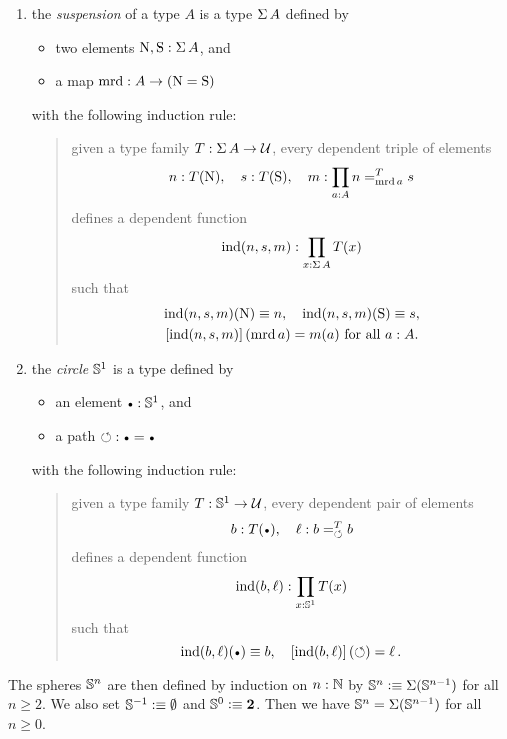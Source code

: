 \documentclass[english,a4paper]{lmcs}
\begin{document}
\begin{enumerate}
\item the \emph{suspension} of a type $A$ is a type $\operatorname{\Sigma} A$ defined
  by
  \begin{itemize}
  \item two elements $\mathrm{N},\mathrm{S}: \operatorname{\Sigma} A$, and
  \item a  map $\operatorname{\mathrm{mrd}} : A \to (\mathrm{N}=\mathrm{S})$
  \end{itemize}
  with the following induction rule:
  \begin{quote}
    given a type family $T: \operatorname{\Sigma} A \to \mathcal{U}$, every dependent
    triple of elements
    \begin{displaymath}
      n: T(\mathrm{N}), \quad s: T(\mathrm{S}),\quad
      m: \prod_{a: A}n =^{T}_{\operatorname{\mathrm{mrd}} a} s
    \end{displaymath}
    defines a dependent function
    \begin{displaymath}
      \operatorname{\mathrm{ind}}(n,s,m):\prod_{x: \operatorname{\Sigma} A} T(x)
    \end{displaymath}
    such that
    \begin{gather*}
      \operatorname{\mathrm{ind}}(n,s,m)(\mathrm{N}) \equiv n,\quad
      \operatorname{\mathrm{ind}}(n,s,m)(\mathrm{S}) \equiv s,\\
      \left[{\operatorname{\mathrm{ind}}(n,s,m)}\right](\operatorname{\mathrm{mrd}} a) = m(a)\ \text{for all $a: A.$}
    \end{gather*}
  \end{quote}
\item the \emph{circle} ${{\mathbb S^{1}}}$ is a type defined by
  \begin{itemize}
  \item an element $\base \from \Sc$, and
  \item a path $\Sloop: \base = \base$
  \end{itemize}
  with the following induction rule:
  \begin{quote}
    given a type family $T: {{\mathbb S^{1}}} \to \mathcal{U}$, every dependent pair of
    elements
    \begin{displaymath}
      b\from T(\base), \quad \ell\from \pathover b T \Sloop b
    \end{displaymath}
    defines a dependent function
    \begin{displaymath}
      \operatorname{\mathrm{ind}}(b,\ell):\prod_{x: {{\mathbb S^{1}}}} T(x)
    \end{displaymath}
    such that
    \begin{displaymath}
      \ind(b,\ell)(\base) \jdeq b,\quad \ap{\ind(b,\ell)}(\Sloop) = \ell \,.
    \end{displaymath}
  \end{quote}
\end{enumerate}
The spheres ${\mathbb S^{n}}$ are then defined by induction on $n:\mathbb{N}$ by
${\mathbb S^{n}} \vcentcolon\equiv \operatorname{\Sigma}({\mathbb S^{n-1}})$ for all $n\geq 2$.
We also set ${\mathbb S^{-1}} \vcentcolon\equiv\emptyset$ and ${\mathbb S^{0}}\vcentcolon\equiv\mathbf{2}$.
Then we have ${\mathbb S^{n}} = \operatorname{\Sigma}({\mathbb S^{n-1}})$ for all $n\ge0$.
\end{document}
